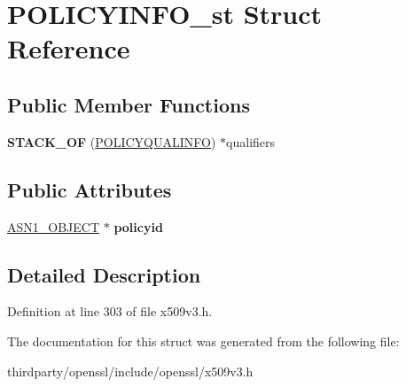 \hypertarget{struct_p_o_l_i_c_y_i_n_f_o__st}{}\section{P\+O\+L\+I\+C\+Y\+I\+N\+F\+O\+\_\+st Struct Reference}
\label{struct_p_o_l_i_c_y_i_n_f_o__st}
\subsection*{Public Member Functions}
\begin{DoxyCompactItemize}
\item 
\mbox{\label{struct_p_o_l_i_c_y_i_n_f_o__st_ab812c4c248735f56cb45cb05300fbad8}} 
{\bfseries S\+T\+A\+C\+K\+\_\+\+OF} (\hyperlink{struct_p_o_l_i_c_y_q_u_a_l_i_n_f_o__st}{P\+O\+L\+I\+C\+Y\+Q\+U\+A\+L\+I\+N\+FO}) $\ast$qualifiers
\end{DoxyCompactItemize}
\subsection*{Public Attributes}
\begin{DoxyCompactItemize}
\item 
\mbox{\label{struct_p_o_l_i_c_y_i_n_f_o__st_afa7cdfb1bac54134558368a3fe4cb61d}} 
\hyperlink{structasn1__object__st}{A\+S\+N1\+\_\+\+O\+B\+J\+E\+CT} $\ast$ {\bfseries policyid}
\end{DoxyCompactItemize}


\subsection{Detailed Description}


Definition at line 303 of file x509v3.\+h.



The documentation for this struct was generated from the following file\+:\begin{DoxyCompactItemize}
\item 
thirdparty/openssl/include/openssl/x509v3.\+h\end{DoxyCompactItemize}
